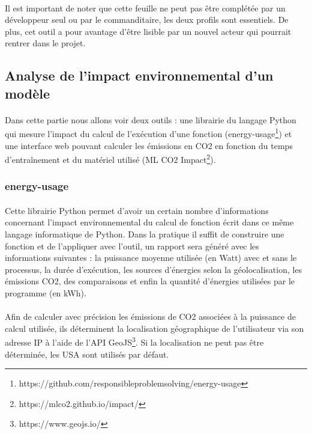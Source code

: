 \documentclass[10pt, french, a4paper]{report}
\begin{document}
\paragraph{}
Il est important de noter que cette feuille ne peut pas être complétée par un développeur seul ou par le commanditaire, les deux profils sont essentiels. De plus, cet outil a pour avantage d'être lisible par un nouvel acteur qui pourrait rentrer dans le projet.

\subsection{Analyse de l'impact environnemental d'un modèle}

\paragraph{}
Dans cette partie nous allons voir deux outils : une librairie du langage Python qui mesure l'impact du calcul de l'exécution d'une fonction (energy-usage\footnote{https://github.com/responsibleproblemsolving/energy-usage}) et une interface web pouvant calculer les émissions en CO2 en fonction du temps d'entraînement et du matériel utilisé (ML CO2 Impact\footnote{https://mlco2.github.io/impact/}).

\subsubsection{energy-usage}
\label{subsec:energy-usage}

\paragraph{}
Cette librairie Python permet d'avoir un certain nombre d'informations concernant l'impact environnemental du calcul de fonction écrit dans ce même langage informatique de Python. Dans la pratique il suffit de construire une fonction et de l'appliquer avec l'outil, un rapport sera généré avec les informations suivantes : la puissance moyenne utilisée (en Watt) avec et sans le processus, la durée d'exécution, les sources d'énergies selon la géolocalisation, les émissions CO2, des comparaisons et enfin la quantité d'énergies utilisées par le programme (en kWh).

\paragraph{}
Afin de calculer avec précision les émissions de CO2 associées à la puissance de calcul utilisée, ils déterminent la localisation géographique de l'utilisateur via son adresse IP à l'aide de l'API GeoJS\footnote{https://www.geojs.io/}. Si la localisation ne peut pas être déterminée, les USA sont utilisés par défaut.
\end{document}
